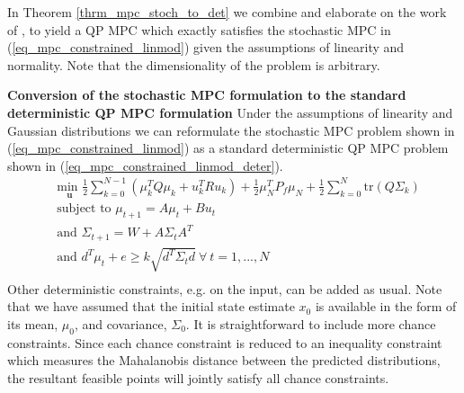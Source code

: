 In Theorem \ref{thrm_mpc_stoch_to_det} we combine and elaborate on the work of \cite{yan1}, \cite{vanhessem1} to yield a QP MPC which exactly satisfies the stochastic MPC in (\ref{eq_mpc_constrained_linmod}) given the assumptions of linearity and normality. Note that the dimensionality of the problem is arbitrary.
\begin{thrm}
\textbf{Conversion of the stochastic MPC formulation to the standard deterministic QP MPC formulation} Under the assumptions of linearity and Gaussian distributions we can reformulate the stochastic MPC problem shown in (\ref{eq_mpc_constrained_linmod}) as a standard deterministic QP MPC problem shown in (\ref{eq_mpc_constrained_linmod_deter}).
\begin{equation}
\begin{aligned}
&\underset{\mathbf{u}}{\text{min }} \frac{1}{2}\sum_{k=0}^{N-1} \left( \mu_k^TQ\mu_k + u_k^TRu_k \right) + \frac{1}{2}\mu_N^TP_f\mu_N + \frac{1}{2}\sum_{k=0}^N \text{tr}(Q\Sigma_k) \\
& \text{subject to } \mu_{t+1}=A\mu_t + Bu_t \\
& \text{and } \Sigma_{t+1} = W+A\Sigma_t A^T \\
& \text{and } d^T\mu_t + e \geq k\sqrt{d^T \Sigma_t d} ~\forall ~t=1,...,N\\
\end{aligned}
\label{eq_mpc_constrained_linmod_deter}
\end{equation}
\label{thrm_mpc_stoch_to_det}
Other deterministic constraints, e.g. on the input, can be added as usual. Note that we have assumed that the initial state estimate $x_0$ is available in the form of its mean, $\mu_0$,  and covariance, $\Sigma_0$. It is straightforward to include more chance constraints. Since each chance constraint is reduced to an inequality constraint which measures the Mahalanobis distance between the predicted distributions, the resultant feasible points will jointly satisfy all chance constraints.  
\end{thrm}
